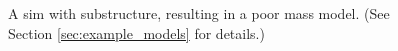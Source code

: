 \documentclass[12pt,preprint]{aastex}
\begin{document}
\begin{figure}
{  }
  \caption[result 6937 (ASW0000vqg)]{A sim with substructure,
    resulting in a poor mass model. (See Section
    \ref{sec:example_models} for details.)}
  \label{fig:6937}
\end{figure}
\end{document}
